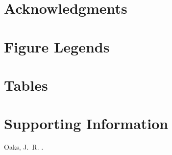 \documentclass[10pt]{article}
\begin{document}

\section*{Acknowledgments}





\section*{Figure Legends}



\section*{Tables}


\clearpage
\setcounter{figure}{0}
\setcounter{table}{0}
\setcounter{page}{1}
\setcounter{section}{0}

\singlespacing

\section*{Supporting Information}
\hangindent=1cm
Oaks, J.\ R. \dppTitle.

\newpage
\singlespacing


\end{document}
